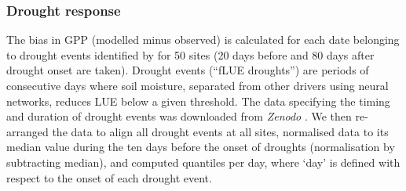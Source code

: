 \documentclass{myreport}
\newcommand{\coo}{CO$_2$}
\begin{document}

\subsubsection{Drought response}
\label{sec:droughtresponse}
The bias in GPP (modelled minus observed) is calculated for each date belonging to drought events identified by \cite{stocker18newphyt} for 50 sites (20 days before and 80 days after drought onset are taken). Drought events (``fLUE droughts'') are periods of consecutive days where soil moisture, separated from other drivers using neural networks, reduces LUE below a given threshold. The data specifying the timing and duration of drought events was downloaded from \textit{Zenodo} \citep{flue}. We then re-arranged the data to align all drought events at all sites, normalised data to its median value during the ten days before the onset of droughts (normalisation by subtracting median), and computed quantiles per day, where `day' is defined with respect to the onset of each drought event.
\end{document}
